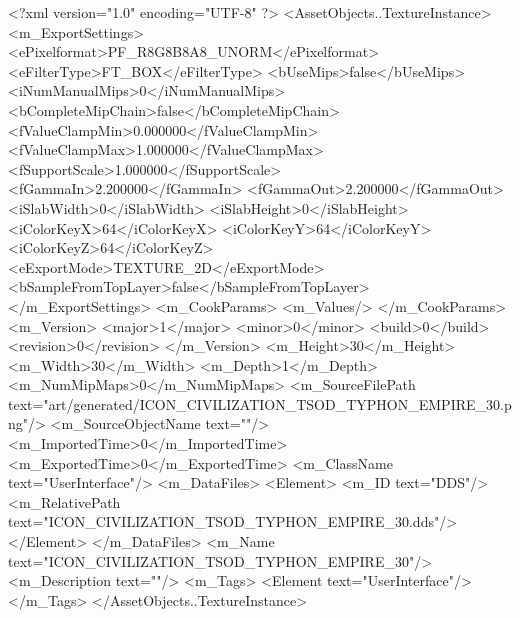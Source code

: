 <?xml version="1.0" encoding="UTF-8" ?>
<AssetObjects..TextureInstance>
	<m_ExportSettings>
		<ePixelformat>PF_R8G8B8A8_UNORM</ePixelformat>
		<eFilterType>FT_BOX</eFilterType>
		<bUseMips>false</bUseMips>
		<iNumManualMips>0</iNumManualMips>
		<bCompleteMipChain>false</bCompleteMipChain>
		<fValueClampMin>0.000000</fValueClampMin>
		<fValueClampMax>1.000000</fValueClampMax>
		<fSupportScale>1.000000</fSupportScale>
		<fGammaIn>2.200000</fGammaIn>
		<fGammaOut>2.200000</fGammaOut>
		<iSlabWidth>0</iSlabWidth>
		<iSlabHeight>0</iSlabHeight>
		<iColorKeyX>64</iColorKeyX>
		<iColorKeyY>64</iColorKeyY>
		<iColorKeyZ>64</iColorKeyZ>
		<eExportMode>TEXTURE_2D</eExportMode>
		<bSampleFromTopLayer>false</bSampleFromTopLayer>
	</m_ExportSettings>
	<m_CookParams>
		<m_Values/>
	</m_CookParams>
	<m_Version>
		<major>1</major>
		<minor>0</minor>
		<build>0</build>
		<revision>0</revision>
	</m_Version>
	<m_Height>30</m_Height>
	<m_Width>30</m_Width>
	<m_Depth>1</m_Depth>
	<m_NumMipMaps>0</m_NumMipMaps>
	<m_SourceFilePath text="art/generated/ICON_CIVILIZATION_TSOD_TYPHON_EMPIRE_30.png"/>
	<m_SourceObjectName text=""/>
	<m_ImportedTime>0</m_ImportedTime>
	<m_ExportedTime>0</m_ExportedTime>
	<m_ClassName text="UserInterface"/>
	<m_DataFiles>
		<Element>
			<m_ID text="DDS"/>
			<m_RelativePath text="ICON_CIVILIZATION_TSOD_TYPHON_EMPIRE_30.dds"/>
		</Element>
	</m_DataFiles>
	<m_Name text="ICON_CIVILIZATION_TSOD_TYPHON_EMPIRE_30"/>
	<m_Description text=""/>
	<m_Tags>
		<Element text="UserInterface"/>
	</m_Tags>
</AssetObjects..TextureInstance>

